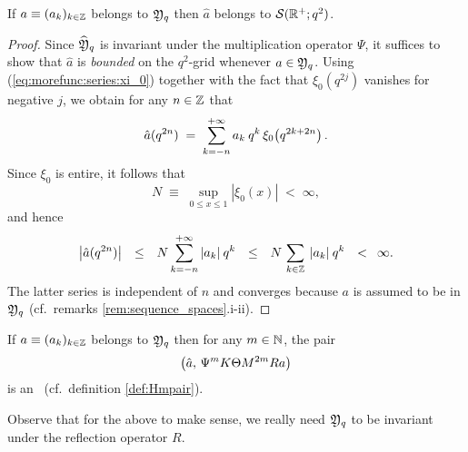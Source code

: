 \begin{lemma}
If\/ $a\equiv (a_k)_{k\in \mathbb{Z}}$ belongs to\/ ${\mathfrak Y}_q$ then\/
$\hat{a}$ belongs to\/ ${\mathcal S}(\mathbb{R}^+;q^2)$.
\end{lemma}
\begin{proof}
Since $\widehat{\mathfrak Y}_q$ is invariant under the multiplication operator $\Psi$,
it suffices to show that $\hat{a}$ is {\em bounded\/} on the $q^2$-grid whenever $a \in {\mathfrak Y}_q$.
Using (\ref{eq:morefunc:series:xi_0}) together with the fact that
$\xi_0(q^{2j})$ vanishes for negative $j$, we obtain for any $n\in \mathbb{Z}$ that
$$   \hat{a}(q^{2n})   \;=\;
         \sum_{k=-n}^{+\infty}  a_k \: q^k \, \xi_0  \! \left(q^{2k+2n}\vertM\right).  $$
Since $\xi_0$ is entire, it follows that
\begin{equation} \label{eq:supremum:xi_0}
  N  \;\equiv\;  \sup_{0 \leq x \leq 1} |\xi_0(x)| \;<\; \infty,
\end{equation}
and hence
$$  \left|\vertM \hat{a}(q^{2n}) \right|
\hspace {0.7em}  \leq  \hspace {0.7em}
         N  \sum_{k=-n}^{+\infty}  |a_k| \: q^k
\hspace {0.7em}  \leq  \hspace {0.7em}
         N \,  \sum_{k\in \ZZ} \: |a_k| \: q^k
\hspace {0.7em}  <  \hspace {0.5em}
        \infty.    $$
The latter series is independent of $n$ and converges because $a$ is assumed to
be in ${\mathfrak Y}_q$ (cf.\ remarks \ref{rem:sequence_spaces}.i-ii).
\end{proof}


\begin{lemma} \label{lemma:Theta_transform:Hmpair}
If\/ $a\equiv (a_k)_{k\in \mathbb{Z}}$ belongs to\/ ${\mathfrak Y}_q$ then for any\/ $m\in\mathbb{N}$,
the pair
$$  \left(\hat{a}, \, \Psi^m K \Theta M^{2m} R a \vertM\right) $$
is an \Hmpair\ (cf.\ definition \ref{def:Hmpair}).
\end{lemma}

Observe that for the above to make sense, we really need ${\mathfrak Y}_q$ to be
invariant under the reflection operator $R$.
\vspace{1ex}

